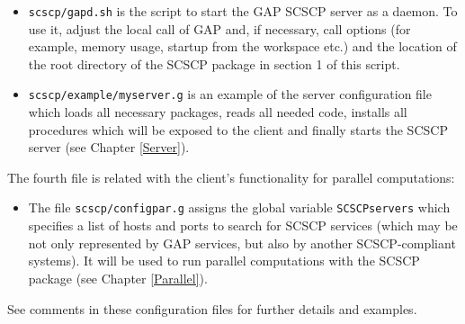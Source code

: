 \documentclass[a4paper,11pt]{report}
\begin{document}
{{\begin{itemize}
\item  \texttt{scscp/gapd.sh} is the script to start the \textsf{GAP} \textsf{SCSCP} server as a daemon. To use it, adjust the local call of \textsf{GAP} and, if necessary, call options (for example, memory usage, startup from the
workspace etc.) and the location of the root directory of the \textsf{SCSCP} package in section 1 of this script. 
\item  \texttt{scscp/example/myserver.g} is an example of the server configuration file which loads all necessary
packages, reads all needed code, installs all procedures which will be exposed
to the client and finally starts the \textsf{SCSCP} server (see Chapter \ref{Server}). 
\end{itemize}
 The fourth file is related with the client's functionality for parallel
computations: 
\begin{itemize}
\item  The file \texttt{scscp/configpar.g} assigns the global variable \texttt{SCSCPservers} which specifies a list of hosts and ports to search for \textsf{SCSCP} services (which may be not only represented by \textsf{GAP} services, but also by another \textsf{SCSCP}-compliant systems). It will be used to run parallel computations with the \textsf{SCSCP} package (see Chapter \ref{Parallel}). 
\end{itemize}
 See comments in these configuration files for further details and examples. }

 }

 
\end{document}
